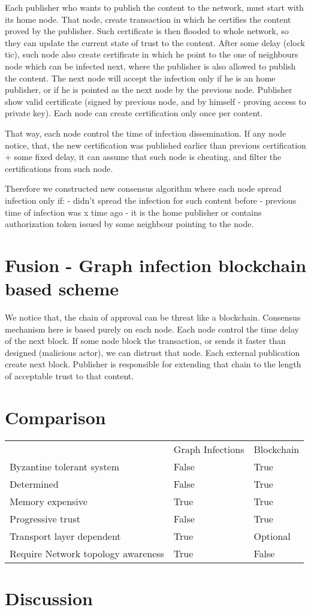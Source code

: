 \documentclass[nostrict]{szablonPG}
\begin{document}
Each publisher who wants to publish the content to the network, must start with its home node. That node, create transaction in which he certifies the content proved by the publisher. Such certificate is then flooded to whole network, so they can update the current state of trust to the content. After some delay (clock tic), such node also create certificate in which he point to the one of neighbours node which can be infected next, where the publisher is also allowed to publish the content. The next node will accept the infection only if he is an home publisher, or if he is pointed as the next node by the previous node. Publisher show valid certificate (signed by previous node, and by himself - proving access to private key). Each node can create certification only once per content. 

That way, each node control the time of infection dissemination. If any node notice, that, the new certification was published earlier than previous certification + some fixed delay, it can assume that such node is cheating, and filter the certifications from such node.

Therefore we constructed new consensus algorithm where each node spread infection only if:
- didn't spread the infection for such content before
- previous time of infection was x time ago
- it is the home publisher or contains authorization token issued by some neighbour pointing to the node.

\section{Fusion - Graph infection blockchain based scheme}
We notice that, the chain of approval can be threat like a blockchain. Consensus mechanism here is based purely on each node. Each node control the time delay of the next block. If some node block the transaction, or sends it faster than designed (malicious actor), we can distrust that node. Each external publication create next block. Publisher is responsible for extending that chain to the length of acceptable trust to that content.

\section{Comparison}
\begin{table}[]
\begin{tabular}{lll}
                                   & Graph Infections & Blockchain \\
Byzantine tolerant system          & False            & True       \\
Determined                         & False            & True       \\
Memory expensive                   & True             & True       \\
Progressive trust                  & False            & True       \\
Transport layer dependent          & True             & Optional   \\
Require Network topology awareness & True             & False     
\end{tabular}
\end{table}


\section{Discussion}



\end{document}

